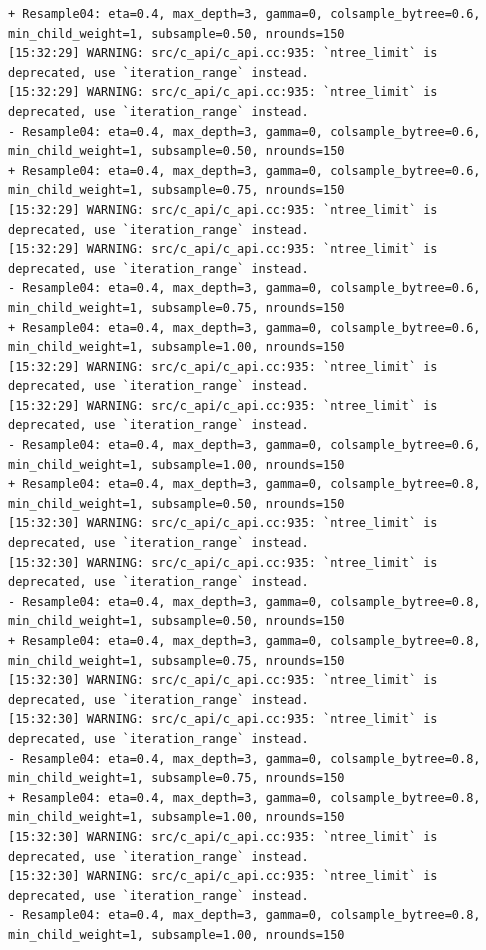 \documentclass[
  letterpaper,
  DIV=11,
  numbers=noendperiod]{scrartcl}
\begin{document}
\begin{verbatim}
+ Resample04: eta=0.4, max_depth=3, gamma=0, colsample_bytree=0.6, min_child_weight=1, subsample=0.50, nrounds=150 
[15:32:29] WARNING: src/c_api/c_api.cc:935: `ntree_limit` is deprecated, use `iteration_range` instead.
[15:32:29] WARNING: src/c_api/c_api.cc:935: `ntree_limit` is deprecated, use `iteration_range` instead.
- Resample04: eta=0.4, max_depth=3, gamma=0, colsample_bytree=0.6, min_child_weight=1, subsample=0.50, nrounds=150 
+ Resample04: eta=0.4, max_depth=3, gamma=0, colsample_bytree=0.6, min_child_weight=1, subsample=0.75, nrounds=150 
[15:32:29] WARNING: src/c_api/c_api.cc:935: `ntree_limit` is deprecated, use `iteration_range` instead.
[15:32:29] WARNING: src/c_api/c_api.cc:935: `ntree_limit` is deprecated, use `iteration_range` instead.
- Resample04: eta=0.4, max_depth=3, gamma=0, colsample_bytree=0.6, min_child_weight=1, subsample=0.75, nrounds=150 
+ Resample04: eta=0.4, max_depth=3, gamma=0, colsample_bytree=0.6, min_child_weight=1, subsample=1.00, nrounds=150 
[15:32:29] WARNING: src/c_api/c_api.cc:935: `ntree_limit` is deprecated, use `iteration_range` instead.
[15:32:29] WARNING: src/c_api/c_api.cc:935: `ntree_limit` is deprecated, use `iteration_range` instead.
- Resample04: eta=0.4, max_depth=3, gamma=0, colsample_bytree=0.6, min_child_weight=1, subsample=1.00, nrounds=150 
+ Resample04: eta=0.4, max_depth=3, gamma=0, colsample_bytree=0.8, min_child_weight=1, subsample=0.50, nrounds=150 
[15:32:30] WARNING: src/c_api/c_api.cc:935: `ntree_limit` is deprecated, use `iteration_range` instead.
[15:32:30] WARNING: src/c_api/c_api.cc:935: `ntree_limit` is deprecated, use `iteration_range` instead.
- Resample04: eta=0.4, max_depth=3, gamma=0, colsample_bytree=0.8, min_child_weight=1, subsample=0.50, nrounds=150 
+ Resample04: eta=0.4, max_depth=3, gamma=0, colsample_bytree=0.8, min_child_weight=1, subsample=0.75, nrounds=150 
[15:32:30] WARNING: src/c_api/c_api.cc:935: `ntree_limit` is deprecated, use `iteration_range` instead.
[15:32:30] WARNING: src/c_api/c_api.cc:935: `ntree_limit` is deprecated, use `iteration_range` instead.
- Resample04: eta=0.4, max_depth=3, gamma=0, colsample_bytree=0.8, min_child_weight=1, subsample=0.75, nrounds=150 
+ Resample04: eta=0.4, max_depth=3, gamma=0, colsample_bytree=0.8, min_child_weight=1, subsample=1.00, nrounds=150 
[15:32:30] WARNING: src/c_api/c_api.cc:935: `ntree_limit` is deprecated, use `iteration_range` instead.
[15:32:30] WARNING: src/c_api/c_api.cc:935: `ntree_limit` is deprecated, use `iteration_range` instead.
- Resample04: eta=0.4, max_depth=3, gamma=0, colsample_bytree=0.8, min_child_weight=1, subsample=1.00, nrounds=150 

\end{verbatim}
\end{document}
